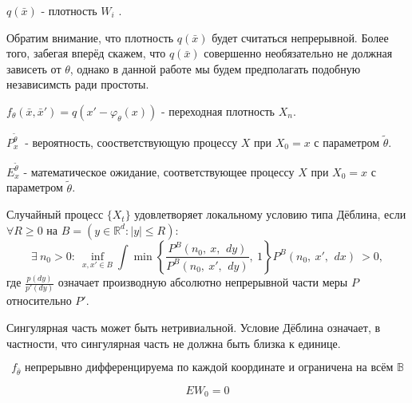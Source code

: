 \begin{Designation}
	$q(\bar{x})$ - плотность $W_i$ .
\end{Designation}
Обратим внимание, что плотность $q(\bar{x})$ будет считаться непрерывной. Более того, забегая вперёд скажем, что $q(\bar{x})$ совершенно необязательно не должная зависеть от $\theta$, однако в данной работе мы будем предполагать подобную независимсть ради простоты.

\begin{Designation}
    $f_{\theta}(\bar{x},\bar{x}')=q(x'-\varphi_{\theta}(x))$ - переходная плотность $X_n$.
\end{Designation}

\begin{Designation}
	$ P^{\tilde{\theta}}_x \ $ - вероятность, соостветствующую процессу $X$ при $X_0=x$ с параметром $\tilde{\theta}$.
\end{Designation}

\begin{Designation}
	$E^{\tilde{\theta}}_x$ - математическое ожидание, соответствующее процессу $X$ при $X_0=x$ с параметром $\tilde{\theta}$.
\end{Designation}

\begin{Definition}
Случайный процесс $\{X_t\}$ удовлетворяет локальному условию типа Дёблина, если $\forall R \geqslant 0$ на $B = (y \in \mathbb{R}^d: |y| \leqslant R)$:
$$
    \exists \ n_0>0 : \ \inf_{x, x' \in B} \int \min \left\{\frac{P^B\left(n_0, \ x, \ \,dy\right)}{P^B\left(n_0, \ x', \ \,dy\right)}, \ 1\right\} P^B \left(n_0, \ x', \ \,dx\right) \ > 0,
$$ \label{Deblin}
где $\frac{p(dy)}{p'(dy)}$ означает производную абсолютно непрерывной части меры $P$ относительно $P'$.
\end{Definition}
Сингулярная часть может быть нетривиальной. Условие Дёблина означает, в частности, что сингулярная часть не должна быть близка к единице.

\begin{equation} \label{assumption1}
    f_{\bar{\theta}} \text{ непрерывно дифференцируема по каждой координате и ограничена на всём $\mathbb{B}$}
\end{equation}

\begin{equation} \label{assumption2}
    E W_0=0
\end{equation}
    
